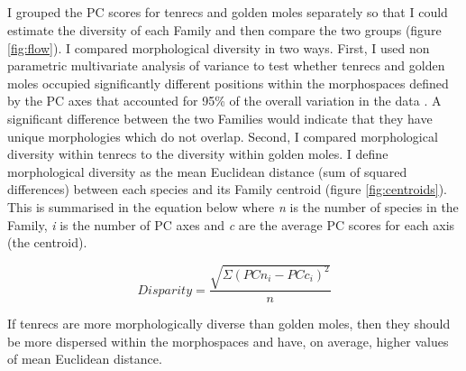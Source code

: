 \subsection{}
	
	I grouped the PC scores for tenrecs and golden moles separately so that I could estimate the diversity of each Family and then compare the two groups (figure \ref{fig:flow}). I compared morphological diversity in two ways. First, I used non parametric multivariate analysis of variance \citep[npMANOVA,][]{Anderson2001} to test whether tenrecs and golden moles occupied significantly different positions within the morphospaces defined by the PC axes that accounted for 95\% of the overall variation in the data \citep[e.g.][]{Serb2011, Ruta2013}. A significant difference between the two Families would indicate that they have unique morphologies which do not overlap. Second, I compared morphological diversity within tenrecs to the diversity within golden moles. I define morphological diversity as the mean Euclidean distance (sum of squared differences) between each species and its Family centroid (figure \ref{fig:centroids}). This is summarised in the equation below where \textit{n} is the number of species in the Family, \textit{i} is the number of PC axes and \textit{c} are the average PC scores for each axis (the centroid). 
	
	\begin{equation}
	Disparity = \frac{\sqrt{\Sigma(PCn_{i}-PCc_{i})^2}}{n}
	\end{equation}
	
	
	If tenrecs are more morphologically diverse than golden moles, then they should be more dispersed within the morphospaces and have, on average, higher values of mean Euclidean distance. 
	

